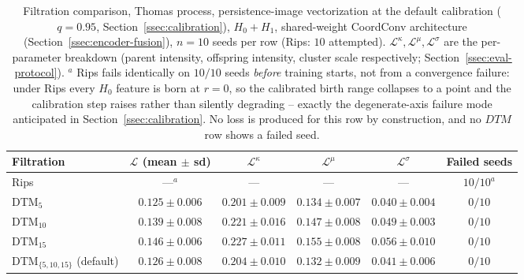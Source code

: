 \documentclass[11pt,letterpaper]{article}
\newcommand{\1}{\mathds{1}}
\theoremstyle{plain}
\theoremstyle{definitioncolon}
\begin{document}
\begin{table}[tbp]
\centering
\footnotesize
\begin{tabular}{lccccc}
\toprule
Filtration & $\mathcal{L}$ (mean $\pm$ sd) & $\mathcal{L}^\kappa$ & $\mathcal{L}^\mu$ & $\mathcal{L}^\sigma$ & Failed seeds \\
\midrule
Rips                          & ---$^a$            & ---               & ---               & ---               & $10/10^a$ \\
DTM$_5$                       & $0.125 \pm 0.006$  & $0.201 \pm 0.009$ & $0.134 \pm 0.007$ & $0.040 \pm 0.004$ & $0/10$ \\
DTM$_{10}$                    & $0.139 \pm 0.008$  & $0.221 \pm 0.016$ & $0.147 \pm 0.008$ & $0.049 \pm 0.003$ & $0/10$ \\
DTM$_{15}$                    & $0.146 \pm 0.006$  & $0.227 \pm 0.011$ & $0.155 \pm 0.008$ & $0.056 \pm 0.010$ & $0/10$ \\
DTM$_{\{5,10,15\}}$ (default) & $0.126 \pm 0.008$  & $0.204 \pm 0.010$ & $0.132 \pm 0.009$ & $0.041 \pm 0.006$ & $0/10$ \\
\bottomrule
\end{tabular}
\caption{Filtration comparison, Thomas process, persistence-image
vectorization at the default calibration ($q=0.95$, Section~\ref{ssec:calibration}),
$H_0{+}H_1$, shared-weight CoordConv architecture
(Section~\ref{ssec:encoder-fusion}), $n=10$ seeds per row (Rips: $10$
attempted). $\mathcal{L}^\kappa,\mathcal{L}^\mu,\mathcal{L}^\sigma$ are the
per-parameter breakdown (parent intensity, offspring intensity, cluster
scale respectively; Section~\ref{ssec:eval-protocol}). $^a$ Rips fails
identically on $10/10$ seeds \emph{before} training starts, not from a
convergence failure: under Rips every $H_0$ feature is born at $r=0$, so the
calibrated birth range collapses to a point and the calibration step raises
rather than silently degrading -- exactly the degenerate-axis failure mode
anticipated in Section~\ref{ssec:calibration}. No loss is produced for this
row by construction, and no $DTM$ row shows a failed seed.}
\label{tab:filtration-comparison}
\end{table}
\end{document}
